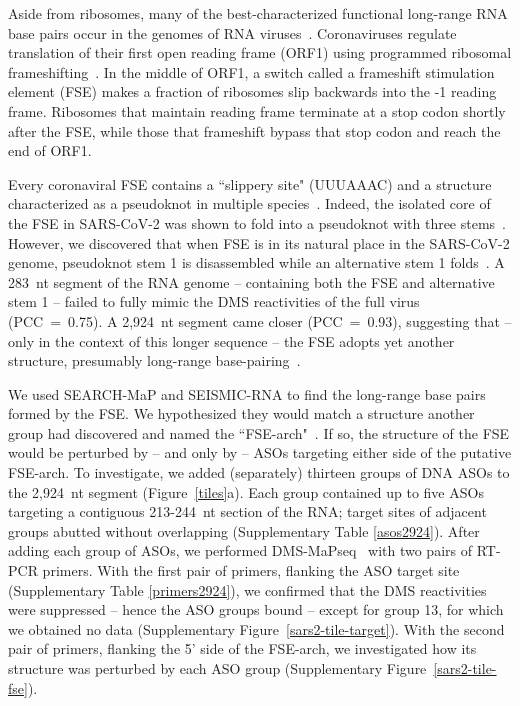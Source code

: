 \documentclass[main.tex]{subfiles}
\begin{document}
Aside from ribosomes, many of the best-characterized functional long-range RNA base pairs occur in the genomes of RNA viruses~\cite{Nicholson2014}.
Coronaviruses regulate translation of their first open reading frame (ORF1) using programmed ribosomal frameshifting~\cite{Plant2008}.
In the middle of ORF1, a switch called a frameshift stimulation element (FSE) makes a fraction of ribosomes slip backwards into the -1 reading frame.
Ribosomes that maintain reading frame terminate at a stop codon shortly after the FSE, while those that frameshift bypass that stop codon and reach the end of ORF1.

Every coronaviral FSE contains a ``slippery site" (UUUAAAC) and a structure characterized as a pseudoknot in multiple species~\cite{Brierley1989,Herald1993,Plant2005b}.
Indeed, the isolated core of the FSE in SARS-CoV-2 was shown to fold into a pseudoknot with three stems~\cite{KZhang2021,Roman2021,Jones2022}.
However, we discovered that when FSE is in its natural place in the SARS-CoV-2 genome, pseudoknot stem 1 is disassembled while an alternative stem 1 folds~\cite{Lan2022}.
A 283~nt segment of the RNA genome -- containing both the FSE and alternative stem 1 -- failed to fully mimic the DMS reactivities of the full virus (PCC~=~0.75).
A 2,924~nt segment came closer (PCC~=~0.93), suggesting that -- only in the context of this longer sequence -- the FSE adopts yet another structure, presumably long-range base-pairing~\cite{Lan2022}.

We used SEARCH-MaP and SEISMIC-RNA to find the long-range base pairs formed by the FSE.
We hypothesized they would match a structure another group had discovered and named the ``FSE-arch"~\cite{Ziv2020}.
If so, the structure of the FSE would be perturbed by -- and only by -- ASOs targeting either side of the putative FSE-arch.
To investigate, we added (separately) thirteen groups of DNA ASOs to the 2,924~nt segment (Figure~\ref{tiles}a).
Each group contained up to five ASOs targeting a contiguous 213-244~nt section of the RNA; target sites of adjacent groups abutted without overlapping (Supplementary Table \ref{asos2924}).
After adding each group of ASOs, we performed DMS-MaPseq~\cite{Zubradt2016} with two pairs of RT-PCR primers.
With the first pair of primers, flanking the ASO target site (Supplementary Table \ref{primers2924}), we confirmed that the DMS reactivities were suppressed -- hence the ASO groups bound -- except for group 13, for which we obtained no data (Supplementary Figure~\ref{sars2-tile-target}).
With the second pair of primers, flanking the 5' side of the FSE-arch, we investigated how its structure was perturbed by each ASO group (Supplementary Figure~\ref{sars2-tile-fse}).
\end{document}
